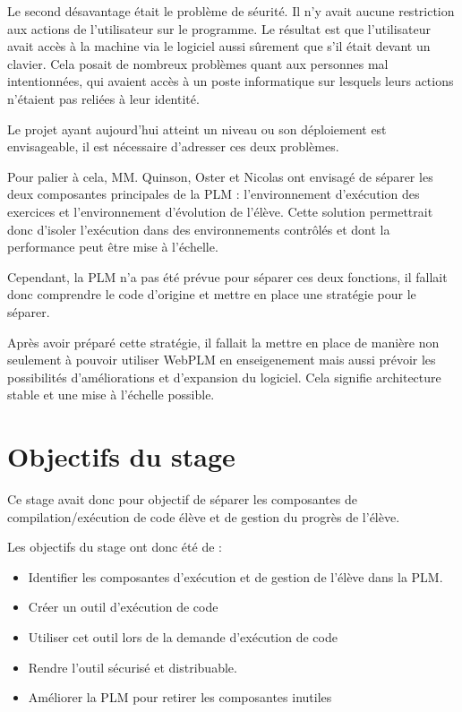 \documentclass[stage]{tnreport}
\begin{document}
Le second désavantage était le problème de séurité. Il n'y avait aucune restriction aux actions de l'utilisateur sur le programme. Le résultat est que l'utilisateur avait accès à la machine via le logiciel aussi sûrement que s'il était devant un clavier. Cela posait de nombreux problèmes quant aux personnes mal intentionnées, qui avaient accès à un poste informatique sur lesquels leurs actions n'étaient pas reliées à leur identité.

Le projet ayant aujourd'hui atteint un niveau ou son déploiement est envisageable, il est nécessaire d'adresser ces deux problèmes.

Pour palier à cela, MM. Quinson, Oster et Nicolas ont envisagé de séparer les deux composantes principales de la PLM : l'environnement d'exécution des exercices et l'environnement d'évolution de l'élève.
Cette solution permettrait donc d'isoler l'exécution dans des environnements contrôlés et dont la performance peut être mise à l'échelle.

Cependant, la PLM n'a pas été prévue pour séparer ces deux fonctions, il fallait donc comprendre le code d'origine et mettre en place une stratégie pour le séparer.

Après avoir préparé cette stratégie, il fallait la mettre en place de manière non seulement à pouvoir utiliser WebPLM en enseigenement mais aussi prévoir les possibilités d'améliorations et d'expansion du logiciel. Cela signifie architecture stable et une mise à l'échelle possible.

\section{Objectifs du stage}

Ce stage avait donc pour objectif de séparer les composantes de compilation/exécution de code élève et de gestion du progrès de l'élève.

Les objectifs du stage ont donc été de :
\begin{itemize}
	\item Identifier les composantes d'exécution et de gestion de l'élève dans la PLM.
	\item Créer un outil d'exécution de code
	\item Utiliser cet outil lors de la demande d'exécution de code
	\item Rendre l'outil sécurisé et distribuable.
	\item Améliorer la PLM pour retirer les composantes inutiles
\end{itemize}
\end{document}
